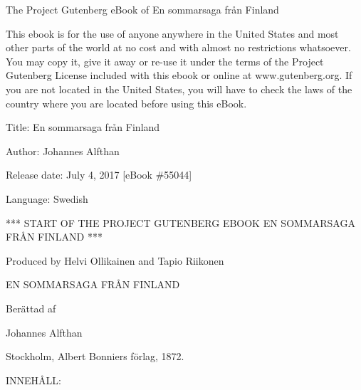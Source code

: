 The Project Gutenberg eBook of En sommarsaga från Finland

This ebook is for the use of anyone anywhere in the United States and
most other parts of the world at no cost and with almost no restrictions
whatsoever. You may copy it, give it away or re-use it under the terms
of the Project Gutenberg License included with this ebook or online at
www.gutenberg.org. If you are not located in the United States, you will
have to check the laws of the country where you are located before using
this eBook.

Title: En sommarsaga från Finland

Author: Johannes Alfthan

Release date: July 4, 2017 {[}eBook \#55044{]}

Language: Swedish

*** START OF THE PROJECT GUTENBERG EBOOK EN SOMMARSAGA FRÅN FINLAND ***

Produced by Helvi Ollikainen and Tapio Riikonen

EN SOMMARSAGA FRÅN FINLAND

Berättad af

Johannes Alfthan

Stockholm, Albert Bonniers förlag, 1872.

INNEHÅLL:

